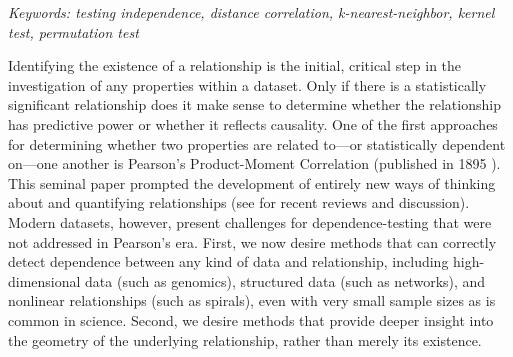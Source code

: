 \documentclass[11pt]{article}
\begin{document}


\noindent%
{\it Keywords: testing independence, distance correlation, k-nearest-neighbor, kernel test, permutation test}

\clearpage
\setcounter{tocdepth}{2}


Identifying the existence of a relationship is the initial, critical step in the investigation of any properties within a dataset. Only if there is a statistically significant relationship does it make sense to determine whether the relationship has predictive power or whether it reflects causality.
One of the first approaches for determining whether two properties are related to---or statistically dependent on---one another is Pearson's Product-Moment Correlation (published in 1895 \cite{Pearson1895}). This seminal paper prompted the development of  entirely new ways of thinking about and quantifying relationships (see \cite{Reimherr2013,JosseHolmes2013} for  recent reviews and discussion).
Modern datasets, however, present  challenges for dependence-testing that were not addressed in Pearson's era.
First, we now desire methods that can correctly detect dependence between any kind of data and relationship, including high-dimensional data (such as genomics), structured data (such as networks), and nonlinear relationships (such as spirals), even with very small sample sizes as is common in science.  Second, we desire methods that provide deeper insight into the geometry of the underlying relationship, rather than merely its existence.    
\end{document}
